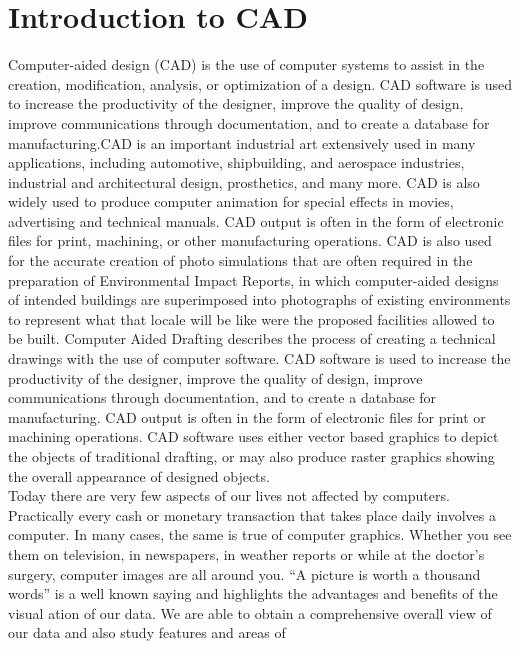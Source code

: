 \section{Introduction to CAD}
Computer-aided design (CAD) is the use of computer systems to assist in the creation, modification, analysis, or optimization of a design. CAD software is used to increase the productivity of the designer, improve the quality of design, improve communications through documentation, and to create a database for manufacturing.CAD is an important industrial art extensively used in many applications, including automotive, shipbuilding, and aerospace industries, industrial and architectural design, prosthetics, and many more. CAD is also widely used to produce computer animation for special effects in movies, advertising and technical manuals. CAD output is often in the form of electronic files for print, machining, or other manufacturing operations. CAD is also used for the accurate creation of photo simulations that are often required in the preparation of Environmental Impact Reports, in which computer-aided designs of intended buildings are superimposed into photographs of existing environments to represent what that locale will be like were the proposed facilities allowed to be built.  Computer­ Aided  Drafting  describes  the  process  of  creating  a
technical  drawings with the use of computer software. CAD software is used to increase the productivity
of  the  designer,  improve  the  quality  of  design,  improve  communications  through  documentation,  and  to
create  a  database  for  manufacturing.  CAD  output  is  often  in  the  form  of  electronic  files  for  print  or
machining  operations.  CAD  software  uses  either  vector  based  graphics  to  depict  the  objects  of
traditional  drafting,  or  may  also  produce  raster  graphics  showing  the  overall   appearance  of  designed
objects.\\
  Today  there  are  very  few  aspects  of  our  lives  not  affected  by  computers.  Practically  every  cash or
monetary  transaction  that  takes  place  daily  involves  a  computer.  In  many  cases,  the  same  is  true  of
computer  graphics.  Whether  you  see  them  on  television,  in  newspapers,  in  weather   reports  or  while  at
the  doctor’s  surgery,  computer  images  are  all  around  you.  “A  picture  is  worth  a  thousand  words”  is  a
well ­known  saying  and  highlights  the  advantages  and  benefits  of  the  visual ation of our data. We
are  able  to  obtain  a  comprehensive  overall  view  of  our  data  and   also  study  features  and  areas  of
